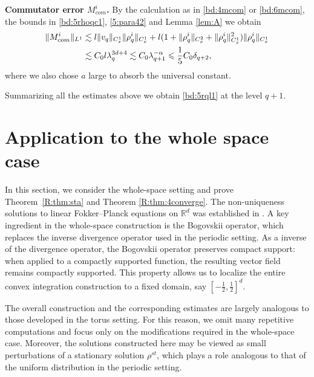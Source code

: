 \documentclass[10pt,a4paper]{amsart}
\numberwithin{equation}{section}
\def\leq{\leqslant}
\def\leq{\leqslant}
\begin{document}
\textbf{Commutator error $M^i_{com} $.} By the calculation as in \eqref{bd:4mcom} or \eqref{bd:6mcom}, the bounds in   \eqref{bd:5rhoqc1}, \eqref{5:para42} and Lemma \ref{lem:A}  we obtain
 \begin{align}
  \|M^i_{ com} \|_{L^1}  & \lesssim l\|v_q\|_{C_{x}^1}\|\rho_q^i\|_{C_{x}^1}+l (1+  \| \rho_q^i\|_{C_{x}^2}+\| \rho_q^i\|_{C_{x}^1}^2)\| \rho_q^i\|_{C_{x}^1}\notag\\
 &\lesssim C_0 l\lambda_q^{3d+4}\lesssim  C_0  \lambda_{q+1}^{-\alpha}\leq \frac{1}{5}C_0 \delta_{q+2},\notag 
   \end{align}  
 where we also chose $a$ large to absorb the universal constant.
 
Summarizing all the estimates above  we obtain   \eqref{bd:5rql1} at the level $q+1$. 

  

\section{Application to the whole space case}\label{R:cogpss4}
In this section, we consider the whole-space setting and prove Theorem~\ref{R:thm:sta} and Theorem \ref{R:thm:4converge}. The non-uniqueness solutions to linear Fokker--Planck equations on $\mathbb{R}^d$ was established in \cite{LR25}. A key ingredient in the whole-space construction is the Bogovskii operator, which replaces the inverse divergence operator used in the periodic setting.
As a  inverse of the divergence operator, the Bogovskii operator preserves compact support: when applied to a compactly supported function, the resulting vector field remains compactly supported. This property allows us to localize the entire convex integration construction to a fixed domain, say $[-\frac12,\frac12]^d.$ 

The overall construction and the corresponding estimates are largely analogous to those developed in the torus setting. For this reason, we omit many repetitive computations and focus only on the modifications required in the whole-space case.
Moreover, the solutions constructed here may be viewed as small perturbations of a stationary solution $\rho^{ st}$, which  plays a role analogous to that of the uniform distribution in the periodic setting.
\end{document}
